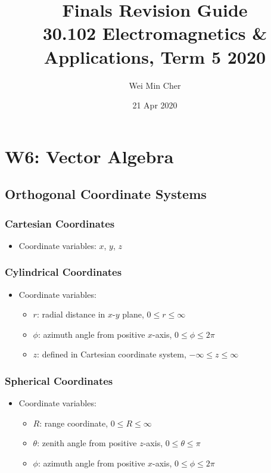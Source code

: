 \documentclass[a4paper]{article}
\begin{document}
\title{Finals Revision Guide\\[0.1cm]
    \large 30.102 Electromagnetics \& Applications, Term 5 2020}
\author{Wei Min Cher}
\date{21 Apr 2020}

\maketitle

\tableofcontents

\newpage
\section{W6: Vector Algebra}

\subsection{Orthogonal Coordinate Systems}

\subsubsection{Cartesian Coordinates}
\begin{itemize}
    \item Coordinate variables: $x$, $y$, $z$
\end{itemize}

\subsubsection{Cylindrical Coordinates}
\begin{itemize}
    \item Coordinate variables:
    \begin{itemize}[label=$\circ$]
        \item $r$: radial distance in $x$-$y$ plane, \quad $0\leq r \leq \infty$
        \item $\phi$: azimuth angle from positive $x$-axis, \quad $0\leq\phi\leq 2\pi$
        \item $z$: defined in Cartesian coordinate system, \quad $-\infty\leq z\leq\infty$
    \end{itemize}
\end{itemize}

\subsubsection{Spherical Coordinates}
\begin{itemize}
    \item Coordinate variables:
    \begin{itemize}[label=$\circ$]
        \item $R$: range coordinate, \quad $0\leq R\leq \infty$
        \item $\theta$: zenith angle from positive $z$-axis, \quad $0\leq\theta\leq\pi$
        \item $\phi$: azimuth angle from positive $x$-axis, \quad $0\leq\phi\leq 2\pi$
    \end{itemize}
\end{itemize}
\end{document}
